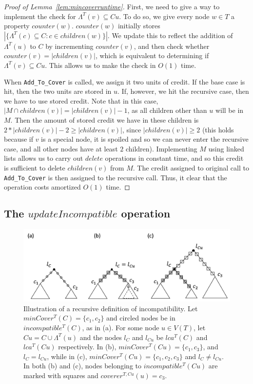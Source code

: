 \documentclass{article}
\newcommand{\leafset}{\Lambda}
\begin{document}
    \begin{proof}[Proof of Lemma~\ref{lem:mincoverruntime}]
        First, we need to give a way to implement the check for $\leafset^{T}(v) \subseteq Cu$. To do so, we give every node $w \in T$ a property $counter(w)$. $counter(w)$ initially stores $|\{\leafset^{T}(c) \subseteq C : c \in children(w)\}|$. We update this to reflect the addition of $\leafset^{T}(u)$ to $C$ by incrementing $counter(v)$, and then check whether $counter(v) = |children(v)|$, which is equivalent to determining if $\leafset^{T}(v) \subseteq Cu$. This allows us to make the check in $O(1)$ time.

        When \texttt{Add\_To\_Cover} is called, we assign it two units of credit. If the base case is hit, then the two units are stored in $u$. If, however, we hit the recursive case, then we have to use stored credit. Note that in this case, $|M \cap children(v)| = |children(v)| - 1$, as all children other than $u$ will be in $M$. Then the amount of stored credit we have in these children is $2 * |children(v)| - 2 \geq |children(v)|$, since $|children(v)| \geq 2$ (this holds because if $v$ is a special node, it is spoiled and so we can never enter the recursive case, and all other nodes have at least $2$ children). Implementing $M$ using linked lists allows us to carry out $delete$ operations in constant time, and so this credit is sufficient to delete $children(v)$ from $M$. The credit assigned to original call to \texttt{Add\_To\_Cover} is then assigned to the recursive call. Thus, it clear that the operation costs amortized $O(1)$ time.
    \end{proof}

    \subsection{The $updateIncompatible$ operation}
    \label{subsec:updateincompatible}

    \begin{figure}[ht]
        \includegraphics[scale=0.6]{incompatibilityrecursive}
        \centering
        \caption{Illustration of a recursive definition of incompatibility. Let $minCover^{T}(C) = \{c_1, c_2\}$ and circled nodes be in $incompatible^{T}(C)$, as in (a). For some node $u \in V(T)$, let $Cu = C \cup \leafset^{T}(u)$ and the nodes $l_C$ and $l_{Cu}$ be $lca^{T}(C)$ and $lca^{T}(Cu)$ respectively. In (b), $minCover^{T}(Cu) = \{c_1, c_3\}$, and $l_C = l_{Cu}$, while in (c), $minCover^{T}(Cu) = \{c_1, c_2, c_3\}$ and $l_C \neq l_{Cu}$. In both (b) and (c), nodes belonging to $incompatible^{T}(Cu)$ are marked with squares and $coverer^{T, Cu}(u) = c_3$.}
        \label{fig:incompatibilityrecursive}
    \end{figure}
\end{document}

